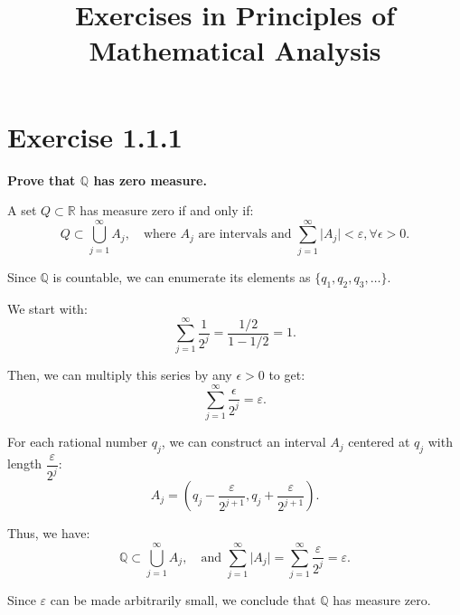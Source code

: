 \documentclass[11pt]{article}
\title{\textbf{Exercises in Principles of Mathematical Analysis}}
\author{}
\date{}
\newcommand{\card}[1]{\lvert #1 \rvert}
\begin{document}
\maketitle

\section*{Exercise 1.1.1}
\textbf{\large Prove that \(\mathbb{Q}\) has zero measure.}

A set \(Q \subset \mathbb{R}\) has measure zero if and only if:
\[Q \subset \bigcup_{j=1}^{\infty} A_j, \quad \text{where } A_j \text{ are intervals and } \sum_{j=1}^{\infty} \card{A_j} < \varepsilon, \forall \epsilon > 0.\]

Since \(\mathbb{Q}\) is countable, we can enumerate its elements as \(\{q_1, q_2, q_3, \ldots\}\). 

We start with:
\[\sum_{j=1}^{\infty} \dfrac{1}{2^{j}} = \dfrac{1/2}{1 - 1/2} = 1.\]

Then, we can multiply this series by any \(\epsilon > 0\) to get:
\[\sum_{j=1}^{\infty} \dfrac{\epsilon}{2^{j}} = \varepsilon.\]

For each rational number \(q_j\), we can construct an interval \(A_j\) centered at \(q_j\) with length \(\dfrac{\varepsilon}{2^{j}}\):
\[A_j = \left(q_j - \dfrac{\varepsilon}{2^{j+1}}, q_j + \dfrac{\varepsilon}{2^{j+1}}\right).\]

Thus, we have:
\[\mathbb{Q} \subset \bigcup_{j=1}^{\infty} A_j, \quad \text{and } \sum_{j=1}^{\infty} \card{A_j} = \sum_{j=1}^{\infty} \dfrac{\varepsilon}{2^{j}} = \varepsilon.\]

Since \(\varepsilon\) can be made arbitrarily small, we conclude that \(\mathbb{Q}\) has measure zero.

\begin{center}
\end{center}
\end{document}
